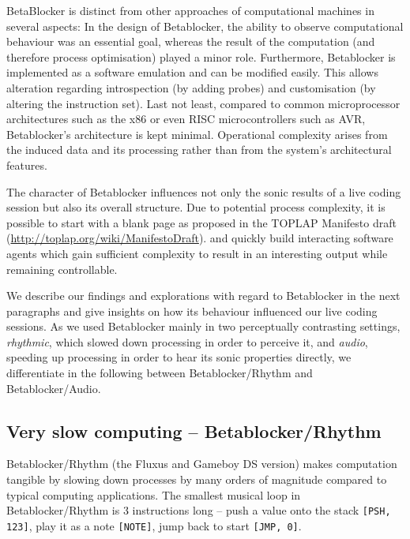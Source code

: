 \documentclass[letterpaper, 12pt]{article}
\begin{document}

BetaBlocker is distinct from other approaches of computational machines in several aspects:
In the design of Betablocker, the ability to observe computational behaviour was an essential goal, whereas the result of the computation (and therefore process optimisation) played a minor role.
Furthermore, Betablocker is implemented as a software emulation and can be modified easily.
This allows alteration regarding introspection (by adding probes) and customisation (by altering the instruction set).
Last not least, compared to common microprocessor architectures such as the x86 \citep{alpert1993-arc}
or even RISC microcontrollers \citep{kane1988-mip} such as AVR, Betablocker's architecture is kept minimal.
Operational complexity arises from the induced data and its processing rather than from the system's architectural features.

The character of Betablocker influences not only the sonic results of a live coding session but also its overall structure.
Due to potential process complexity, it is possible to start with a blank page as proposed in the TOPLAP Manifesto draft (\url{http://toplap.org/wiki/ManifestoDraft}).
and quickly build interacting software agents which gain sufficient complexity to result in an interesting output while remaining controllable.

We describe our findings and explorations with regard to Betablocker in the next paragraphs and give insights on how its behaviour influenced our live coding sessions.
As we used Betablocker mainly in two perceptually contrasting settings, \emph{rhythmic}, which slowed down processing in order to perceive it, and \emph{audio}, speeding up processing in order to hear its sonic properties directly, we differentiate in the following between Betablocker/Rhythm and Betablocker/Audio.
\parskip 18pt

\subsection{Very slow computing -- Betablocker/Rhythm}
\label{sub:slow_computing}

Betablocker/Rhythm (the Fluxus and Gameboy DS version) makes computation tangible by slowing down processes by many orders of magnitude compared to typical computing applications.
The smallest musical loop in Betablocker/Rhythm is 3 instructions long -- push a value onto the stack \texttt{[PSH, 123]}, play it as a note \texttt{[NOTE]}, jump back to start \texttt{[JMP, 0]}.
\end{document}
